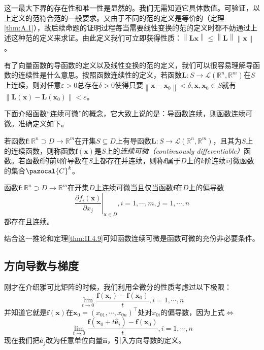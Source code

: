 \documentclass[main.tex]{subfiles}
\begin{document}
这一最大下界的存在性和唯一性是显然的。我们无需知道它具体数值。可验证，以上定义的范符合范的一般要求。又由于不同的范的定义是等价的（定理\ref{thm:A.1}），故后续命题的证明过程每当需要线性变换的范的定义时都不妨通过上述这种范的定义来求证。由此定义我们可立即获得性质：$\left\|\mathbf{Lx}\right\|\leq\left\|\mathbf{L}\right\|\left\|\mathbf{x}\right\|$。

有了向量函数的导函数的定义以及线性变换的范的定义，我们可以很容易理解导函数的连续性是什么意思。按照函数连续性的定义，若函数$\mathbf{L}:S\rightarrow\mathcal{L}\left(\mathbb{R}^n,\mathbb{R}^m\right)$在$S$上连续，则对任意$\varepsilon>0$总存在$\delta>0$使得只要$\left\|\mathbf{x}-\mathbf{x}_0\right\|<\delta,\mathbf{x},\mathbf{x}_0\in S$就有$\left\|\mathbf{L}\left(\mathbf{x}\right)-\mathbf{L}\left(\mathbf{x}_0\right)\right\|<\varepsilon$。

下面介绍函数“连续可微”的概念，它大致上说的是：导函数连续，则函数连续可微。准确定义如下。

\begin{definition}[连续可微函数]\label{def:II.4.17}
    若函数$\mathbf{f}:\mathbb{R}^n\supset D\rightarrow\mathbb{R}^m$在开集$S\subseteq D$上有导函数$\mathbf{L}:S\rightarrow\mathcal{L}\left(\mathbb{R}^n,\mathbb{R}^m\right)$，且其为$S$上的连续函数，则称函数$\mathbf{f}\left(\mathbf{x}\right)$是$S$上的\emph{连续可微（continuously differentiable）}函数。若函数$\mathbf{f}$的前$k$阶导数在$S$上都存在并连续，则称$\mathbf{f}$属于$D$上的$k$阶连续可微函数的集合$\pazocal{C}^k$。
\end{definition}

\begin{corollary}
    函数$\mathbf{f}:\mathbb{R}^n\supset D\rightarrow\mathbb{R}^m$在开集$D$上连续可微当且仅当函数$\mathbf{f}$在$D$上的偏导数
    \[
        \left.\frac{\partial f_i\left(\mathbf{x}\right)}{\partial x_j}\right|_{\mathbf{x}\in D},i=1,\cdots,m,j=1,\cdots,n
    \]
    都存在且连续。
\end{corollary}

结合这一推论和定理\ref{thm:II.4.9}可知函数连续可微是函数可微的充份非必要条件。

\subsection{方向导数与梯度}
刚才在介绍雅可比矩阵的时候，我们利用全微分的性质考虑过以下极限：
\[
    \lim_{t\to 0}\frac{\mathbf{f}\left(\mathbf{x}_i\right)-\mathbf{f}\left(\mathbf{x}_0\right)}{t},i=1,\cdots,n\]
并知道它就是$\mathbf{f}\left(\mathbf{x}\right)$在$\mathbf{x}_0=\left(x_{01},\cdots,x_{0n}\right)^\intercal$处对$x_{0i}$的偏导数，因为上式$\Leftrightarrow$
\[
    \lim_{t\rightarrow 0}\frac{\mathbf{f}\left(\mathbf{x}_0+t\mathbf{\hat{e}}_i\right)-\mathbf{f}\left(\mathbf{x}_0\right)}{t},i=1,\cdots,n
\]
现在我们把$\mathbf{\hat{e}}_j$改为任意单位向量$\mathbf{\hat{n}}$，引入方向导数的定义。
\end{document}
